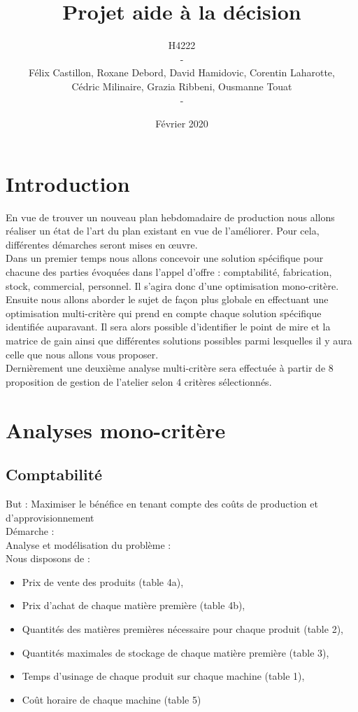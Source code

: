 \documentclass{article}
\title{{\Huge Projet aide à la décision}}
\author{{\Large
H4222}\\
-
\\
Félix Castillon, Roxane Debord, David Hamidovic, Corentin Laharotte,\\
Cédric Milinaire, Grazia Ribbeni, Ousmanne Touat\\
-}
\date{Février 2020}
\begin{document}
\maketitle
\thispagestyle{empty}

\section{Introduction}
En vue de trouver un nouveau plan hebdomadaire de production nous allons réaliser un état de l’art du plan existant en vue de l’améliorer. Pour cela, différentes démarches seront mises en œuvre.\\

Dans un premier temps nous allons concevoir une solution spécifique pour chacune des parties évoquées dans l’appel d’offre : comptabilité, fabrication, stock, commercial, personnel. Il s'agira donc d'une optimisation mono-critère.\\
Ensuite nous allons aborder le sujet de façon plus globale en effectuant une optimisation multi-critère qui prend en compte chaque solution spécifique identifiée auparavant. Il sera alors possible d'identifier le point de mire et la matrice de gain ainsi que différentes solutions possibles parmi lesquelles il y aura celle que nous allons vous proposer.\\
Dernièrement une deuxième analyse multi-critère sera effectuée à partir de 8 proposition de gestion de l'atelier selon 4 critères sélectionnés.


\section{Analyses mono-critère}
\subsection{Comptabilité}

But : Maximiser le bénéfice en tenant compte des coûts de production et d’approvisionnement\\

Démarche :\\
Analyse et modélisation du problème :\\
Nous disposons de : \\

\begin{itemize}
\item Prix de vente des produits (table 4a),
\item Prix d’achat de chaque matière première (table 4b),
\item Quantités des matières premières nécessaire pour chaque produit (table 2),
\item Quantités maximales de stockage de chaque matière première (table 3),
\item Temps d’usinage de chaque produit sur chaque machine (table 1),
\item Coût horaire de chaque machine (table 5)
\end{itemize}
\end{document}
